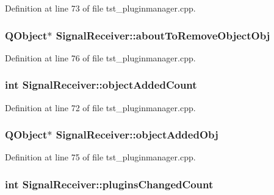 \-Definition at line 73 of file tst\-\_\-pluginmanager.\-cpp.

\hypertarget{class_signal_receiver_a6eb3b4bcea370d253baf00da53fdab81}{
\subsubsection[{about\-To\-Remove\-Object\-Obj}]{\setlength{\rightskip}{0pt plus 5cm}\-Q\-Object$\ast$ {\bf \-Signal\-Receiver\-::about\-To\-Remove\-Object\-Obj}}}\label{class_signal_receiver_a6eb3b4bcea370d253baf00da53fdab81}


\-Definition at line 76 of file tst\-\_\-pluginmanager.\-cpp.

\hypertarget{class_signal_receiver_a6930c4532fbbbd583414806ebfb5509e}{
\subsubsection[{object\-Added\-Count}]{\setlength{\rightskip}{0pt plus 5cm}int {\bf \-Signal\-Receiver\-::object\-Added\-Count}}}\label{class_signal_receiver_a6930c4532fbbbd583414806ebfb5509e}


\-Definition at line 72 of file tst\-\_\-pluginmanager.\-cpp.

\hypertarget{class_signal_receiver_a198c9501873f7f4b90f636190fdc266a}{
\subsubsection[{object\-Added\-Obj}]{\setlength{\rightskip}{0pt plus 5cm}\-Q\-Object$\ast$ {\bf \-Signal\-Receiver\-::object\-Added\-Obj}}}\label{class_signal_receiver_a198c9501873f7f4b90f636190fdc266a}


\-Definition at line 75 of file tst\-\_\-pluginmanager.\-cpp.

\hypertarget{class_signal_receiver_a38ab4851af216c217c3469c177a85ce3}{
\subsubsection[{plugins\-Changed\-Count}]{\setlength{\rightskip}{0pt plus 5cm}int {\bf \-Signal\-Receiver\-::plugins\-Changed\-Count}}}\label{class_signal_receiver_a38ab4851af216c217c3469c177a85ce3}


